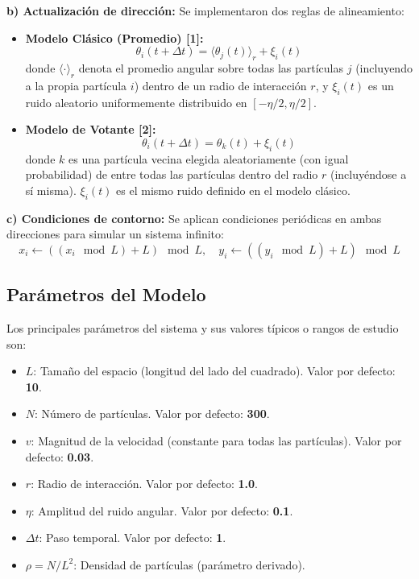 \documentclass{article}
\begin{document}
\textbf{b) Actualización de dirección:}
Se implementaron dos reglas de alineamiento:
\begin{itemize}
\item \textbf{Modelo Clásico (Promedio) [1]:}
\begin{equation}
\theta_i(t + \Delta t) = \langle \theta_j(t) \rangle_{r} + \xi_i(t)
\label{eq:posicion}
\end{equation}
donde $\langle \cdot \rangle_{r}$ denota el promedio angular sobre todas las partículas $j$ (incluyendo a la propia partícula $i$) dentro de un radio de interacción $r$, y $\xi_i(t)$ es un ruido aleatorio uniformemente distribuido en $[-\eta/2, \eta/2]$.

\item \textbf{Modelo de Votante [2]:}
\begin{equation}
\theta_i(t + \Delta t) = \theta_k(t) + \xi_i(t)
\label{eq:posicion}
\end{equation}
donde $k$ es una partícula vecina elegida aleatoriamente (con igual probabilidad) de entre todas las partículas dentro del radio $r$ (incluyéndose a sí misma). $\xi_i(t)$ es el mismo ruido definido en el modelo clásico.
\end{itemize}

\textbf{c) Condiciones de contorno:} Se aplican condiciones periódicas en ambas direcciones para simular un sistema infinito:
\begin{equation}
x_i \leftarrow ((x_i \mod L) + L) \mod L, \quad y_i \leftarrow ((y_i \mod L) + L) \mod L
\label{eq:posicion}
\end{equation}

\subsection{Parámetros del Modelo}
Los principales parámetros del sistema y sus valores típicos o rangos de estudio son:
\begin{itemize}
\item $L$: Tamaño del espacio (longitud del lado del cuadrado). Valor por defecto: \textbf{10}.
\item $N$: Número de partículas. Valor por defecto: \textbf{300}.
\item $v$: Magnitud de la velocidad (constante para todas las partículas). Valor por defecto: \textbf{0.03}.
\item $r$: Radio de interacción. Valor por defecto: \textbf{1.0}.
\item $\eta$: Amplitud del ruido angular. Valor por defecto: \textbf{0.1}.
\item $\Delta t$: Paso temporal. Valor por defecto: \textbf{1}.
\item $\rho = N/L^2$: Densidad de partículas (parámetro derivado).
\end{itemize}
\end{document}
